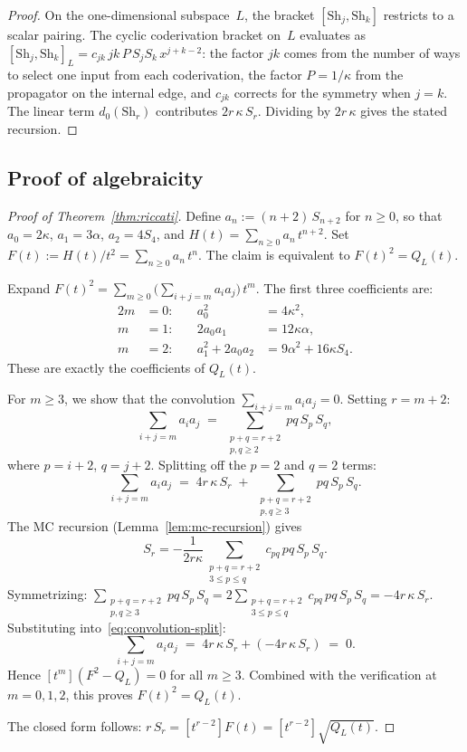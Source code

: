 \documentclass[11pt,reqno]{amsart}
\theoremstyle{definition}
\theoremstyle{remark}
\newcommand{\Sh}{\mathrm{Sh}}
\numberwithin{equation}{section}
\begin{document}
\begin{proof}
On the one-dimensional subspace~$L$, the bracket
$[\Sh_j, \Sh_k]$ restricts to a scalar pairing.
The cyclic coderivation bracket on~$L$ evaluates as
$[\Sh_j, \Sh_k]_L = c_{jk}\, jk\, P\, S_j S_k\, x^{j+k-2}$:
the factor $jk$ comes from the number of ways to select
one input from each coderivation, the factor
$P = 1/\kappa$ from the propagator on the internal edge,
and $c_{jk}$ corrects for the symmetry when $j = k$.
The linear term $d_0(\Sh_r)$ contributes
$2r\,\kappa\,S_r$. Dividing by $2r\,\kappa$ gives the
stated recursion.
\end{proof}


\subsection{Proof of algebraicity}\label{subsec:proof}

\begin{proof}[Proof of Theorem~\textup{\ref{thm:riccati}}]
Define $a_n := (n+2)\, S_{n+2}$ for $n \ge 0$, so that
$a_0 = 2\kappa$, $a_1 = 3\alpha$, $a_2 = 4S_4$, and
$H(t) = \sum_{n \ge 0} a_n\, t^{n+2}$.
Set $F(t) := H(t)/t^2 = \sum_{n \ge 0} a_n\, t^n$.
The claim is equivalent to $F(t)^2 = Q_L(t)$.

Expand $F(t)^2 = \sum_{m \ge 0}
\bigl(\sum_{i+j=m} a_i a_j\bigr)\, t^m$.
The first three coefficients are:
\begin{alignat*}{2}
 m &= 0: &\quad a_0^2 &= 4\kappa^2, \\
 m &= 1: &\quad 2a_0 a_1 &= 12\kappa\alpha, \\
 m &= 2: &\quad a_1^2 + 2a_0 a_2
 &= 9\alpha^2 + 16\kappa S_4.
\end{alignat*}
These are exactly the coefficients of $Q_L(t)$.

For $m \ge 3$, we show that the convolution
$\sum_{i+j=m} a_i a_j = 0$.
Setting $r = m + 2$:
\[
 \sum_{i+j=m} a_i a_j
 \;=\;
 \sum_{\substack{p+q = r+2 \\ p, q \ge 2}}
 pq\, S_p\, S_q,
\]
where $p = i+2$, $q = j+2$.
Splitting off the $p = 2$ and $q = 2$ terms:
\begin{equation}\label{eq:convolution-split}
 \sum_{i+j=m} a_i a_j
 \;=\;
 4r\,\kappa\, S_r
 \;+\;
 \sum_{\substack{p+q=r+2 \\ p,q \ge 3}}
 pq\, S_p\, S_q.
\end{equation}
The MC recursion (Lemma~\ref{lem:mc-recursion}) gives
\[
 S_r = -\frac{1}{2r\kappa}
 \sum_{\substack{p+q=r+2 \\ 3 \le p \le q}}
 c_{pq}\, pq\, S_p\, S_q.
\]
Symmetrizing:
$\sum_{\substack{p+q=r+2 \\ p,q \ge 3}} pq\, S_p\, S_q
= 2 \sum_{\substack{p+q=r+2 \\ 3 \le p \le q}}
c_{pq}\, pq\, S_p\, S_q
= -4r\,\kappa\, S_r$.
Substituting into~\eqref{eq:convolution-split}:
\[
 \sum_{i+j=m} a_i a_j
 \;=\;
 4r\,\kappa\, S_r + (-4r\,\kappa\, S_r)
 \;=\; 0.
\]
Hence $[t^m](F^2 - Q_L) = 0$ for all $m \ge 3$.
Combined with the verification at $m = 0, 1, 2$,
this proves $F(t)^2 = Q_L(t)$.

The closed form follows:
$r\, S_r = [t^{r-2}]F(t) = [t^{r-2}]\sqrt{Q_L(t)}$.
\end{proof}
\end{document}
